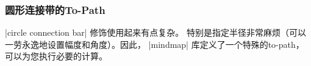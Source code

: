 \subsubsection{圆形连接带的To-Path}


|circle connection bar| 修饰使用起来有点复杂。 特别是指定半径非常麻烦（可以一劳永逸地设置幅度和角度）。因此， |mindmap| 库定义了一个特殊的to-path，可以为您执行必要的计算。

